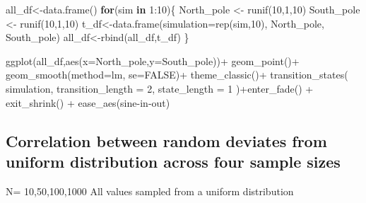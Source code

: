\documentclass[
  letterpaper,
  DIV=11,
  numbers=noendperiod]{scrreprt}
\newenvironment{Shaded}{\begin{snugshade}}{\end{snugshade}}
\newcommand{\AttributeTok}[1]{\textcolor[rgb]{0.40,0.45,0.13}{#1}}
\newcommand{\ConstantTok}[1]{\textcolor[rgb]{0.56,0.35,0.01}{#1}}
\newcommand{\ControlFlowTok}[1]{\textcolor[rgb]{0.00,0.23,0.31}{\textbf{#1}}}
\newcommand{\DecValTok}[1]{\textcolor[rgb]{0.68,0.00,0.00}{#1}}
\newcommand{\FunctionTok}[1]{\textcolor[rgb]{0.28,0.35,0.67}{#1}}
\newcommand{\NormalTok}[1]{\textcolor[rgb]{0.00,0.23,0.31}{#1}}
\newcommand{\OtherTok}[1]{\textcolor[rgb]{0.00,0.23,0.31}{#1}}
\newcommand{\SpecialCharTok}[1]{\textcolor[rgb]{0.37,0.37,0.37}{#1}}
\newcommand{\StringTok}[1]{\textcolor[rgb]{0.13,0.47,0.30}{#1}}
\begin{document}
\begin{Shaded}
\begin{Highlighting}[]
\NormalTok{all\_df}\OtherTok{\textless{}{-}}\FunctionTok{data.frame}\NormalTok{()}
\ControlFlowTok{for}\NormalTok{(sim }\ControlFlowTok{in} \DecValTok{1}\SpecialCharTok{:}\DecValTok{10}\NormalTok{)\{}
\NormalTok{  North\_pole }\OtherTok{\textless{}{-}} \FunctionTok{runif}\NormalTok{(}\DecValTok{10}\NormalTok{,}\DecValTok{1}\NormalTok{,}\DecValTok{10}\NormalTok{)}
\NormalTok{  South\_pole }\OtherTok{\textless{}{-}} \FunctionTok{runif}\NormalTok{(}\DecValTok{10}\NormalTok{,}\DecValTok{1}\NormalTok{,}\DecValTok{10}\NormalTok{)}
\NormalTok{  t\_df}\OtherTok{\textless{}{-}}\FunctionTok{data.frame}\NormalTok{(}\AttributeTok{simulation=}\FunctionTok{rep}\NormalTok{(sim,}\DecValTok{10}\NormalTok{),}
\NormalTok{                                  North\_pole,}
\NormalTok{                                  South\_pole)}
\NormalTok{  all\_df}\OtherTok{\textless{}{-}}\FunctionTok{rbind}\NormalTok{(all\_df,t\_df)}
\NormalTok{\}}


\FunctionTok{ggplot}\NormalTok{(all\_df,}\FunctionTok{aes}\NormalTok{(}\AttributeTok{x=}\NormalTok{North\_pole,}\AttributeTok{y=}\NormalTok{South\_pole))}\SpecialCharTok{+}
  \FunctionTok{geom\_point}\NormalTok{()}\SpecialCharTok{+}
  \FunctionTok{geom\_smooth}\NormalTok{(}\AttributeTok{method=}\NormalTok{lm, }\AttributeTok{se=}\ConstantTok{FALSE}\NormalTok{)}\SpecialCharTok{+}
  \FunctionTok{theme\_classic}\NormalTok{()}\SpecialCharTok{+}
  \FunctionTok{transition\_states}\NormalTok{(}
\NormalTok{    simulation,}
    \AttributeTok{transition\_length =} \DecValTok{2}\NormalTok{,}
    \AttributeTok{state\_length =} \DecValTok{1}
\NormalTok{  )}\SpecialCharTok{+}\FunctionTok{enter\_fade}\NormalTok{() }\SpecialCharTok{+} 
  \FunctionTok{exit\_shrink}\NormalTok{() }\SpecialCharTok{+}
  \FunctionTok{ease\_aes}\NormalTok{(}\StringTok{\textquotesingle{}sine{-}in{-}out\textquotesingle{}}\NormalTok{)}
\end{Highlighting}
\end{Shaded}

\subsection{Correlation between random deviates from uniform
distribution across four sample
sizes}\label{correlation-between-random-deviates-from-uniform-distribution-across-four-sample-sizes}

N= 10,50,100,1000 All values sampled from a uniform distribution
\end{document}
